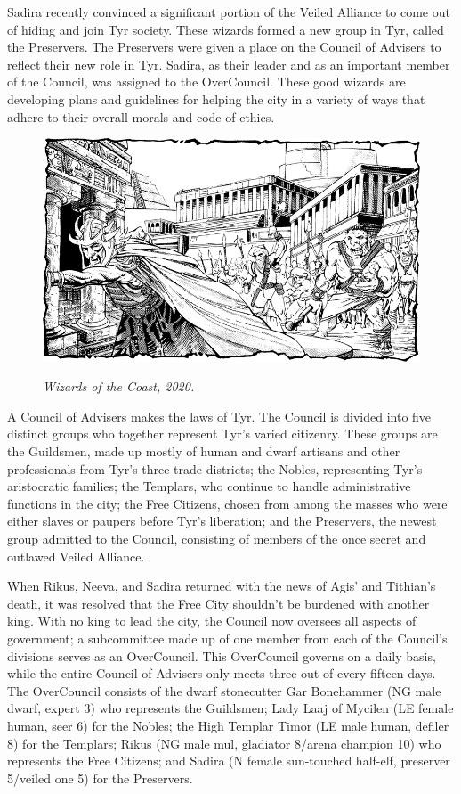 {	Sadira recently convinced a significant portion of the Veiled Alliance to come out of hiding and join Tyr society. These wizards formed a new group in Tyr, called the Preservers. The Preservers were given a place on the Council of Advisers to reflect their new role in Tyr. Sadira, as their leader and as an important member of the Council, was assigned to the OverCouncil. These good wizards are developing plans and guidelines for helping the city in a variety of ways that adhere to their overall morals and code of ethics.
}
{
\begin{figure}[b!]
\centering
\includegraphics[width=\textwidth]{images/tyr-2.png}
\par\textit{\small\textcopyright Wizards of the Coast, 2020.}
\end{figure}

	A Council of Advisers makes the laws of Tyr. The Council is divided into five distinct groups who together represent Tyr's varied citizenry. These groups are the Guildsmen, made up mostly of human and dwarf artisans and other professionals from Tyr's three trade districts; the Nobles, representing Tyr's aristocratic families; the Templars, who continue to handle administrative functions in the city; the Free Citizens, chosen from among the masses who were either slaves or paupers before Tyr's liberation; and the Preservers, the newest group admitted to the Council, consisting of members of the once secret and outlawed Veiled Alliance.

	When Rikus, Neeva, and Sadira returned with the news of Agis' and Tithian's death, it was resolved that the Free City shouldn't be burdened with another king. With no king to lead the city, the Council now oversees all aspects of government; a subcommittee made up of one member from each of the Council's divisions serves as an OverCouncil. This OverCouncil governs on a daily basis, while the entire Council of Advisers only meets three out of every fifteen days. The OverCouncil consists of the dwarf stonecutter Gar Bonehammer (NG male dwarf, expert 3) who represents the Guildsmen; Lady Laaj of Mycilen (LE female human, seer 6) for the Nobles; the High Templar Timor (LE male human, defiler 8) for the Templars; Rikus (NG male mul, gladiator 8/arena champion 10) who represents the Free Citizens; and Sadira (N female sun-touched half-elf, preserver 5/veiled one 5) for the Preservers.

}
